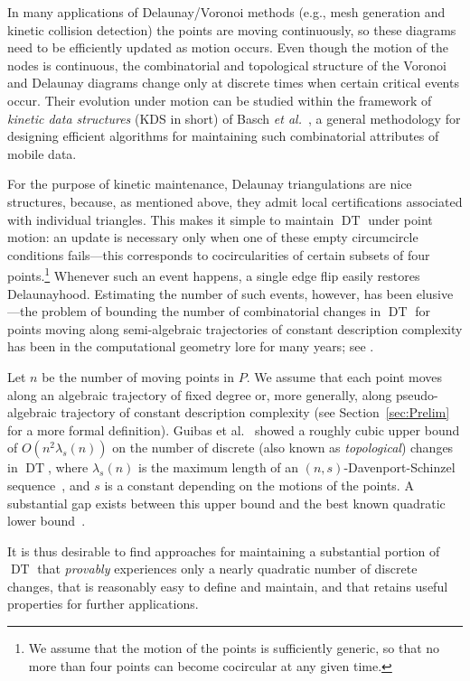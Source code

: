 \documentclass[letter,11pt]{article}
\def\DT{\mathop{\mathrm{DT}}}
\begin{document}
In many applications of Delaunay/Voronoi methods (e.g., mesh generation and kinetic collision detection) the points are moving continuously, so
these diagrams need to be efficiently updated as motion occurs.
Even though the motion of the nodes is continuous, the combinatorial and topological structure of the Voronoi and
Delaunay diagrams change only at
discrete times when certain critical events occur. Their evolution
under motion can be studied within the framework of {\em kinetic data
structures} (KDS in short) of Basch {\em et al.}~\cite{bgh-dsmd-99,285869,g-kdssar-98},
a general methodology for designing efficient algorithms for maintaining
such combinatorial attributes of mobile data. 


For the purpose of kinetic maintenance, Delaunay triangulations are 
nice structures, because, as mentioned above, they admit local 
certifications associated with individual triangles.  This makes 
it simple to maintain $\DT$ under point motion: an update is 
necessary only when one of these empty circumcircle conditions 
fails---this corresponds to cocircularities of certain subsets of
four points.\footnote{We assume that the motion of the points is sufficiently generic, so that no more than four points can become cocircular at any given time.} Whenever such an event happens, 
a single edge flip easily restores Delaunayhood. Estimating the 
number of such events, however, has been elusive---the problem 
of bounding the number of combinatorial changes in $\DT$ for 
points moving along semi-algebraic trajectories of constant description complexity has been in the 
computational geometry lore for many years; see \cite{TOPP}.

Let $n$ be the number of moving points in $P$. We
assume that each point moves along an algebraic trajectory of
fixed degree or, more generally, along pseudo-algebraic trajectory of constant description complexity (see Section~\ref{sec:Prelim} for a more formal
definition).
Guibas et al.~\cite{gmr-vdmpp-92} showed a roughly cubic upper bound of
$O(n^2 \lambda_s(n))$ on the number of discrete (also known as \textit{topological}) changes in $\DT$, where $\lambda_s(n)$ is the maximum length
of an $(n,s)$-Davenport-Schinzel sequence~\cite{SA95}, and $s$ is a constant
depending on the motions of the points. A substantial gap exists between this upper bound
and the best known quadratic lower bound~\cite{SA95}. 


It is thus desirable to find approaches for maintaining a substantial 
portion of $\DT$ that {\em provably} experiences only a nearly 
quadratic number of discrete changes, that is reasonably easy to define and 
maintain, and that retains useful properties for further applications.
\end{document}

